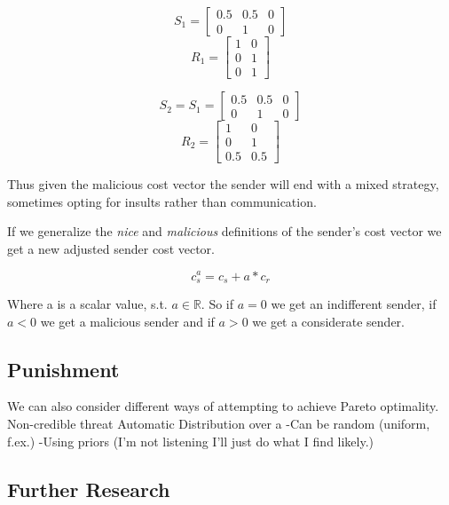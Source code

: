 \documentclass[10]{article}
\begin{document}
\begin{equation*}
S_1=
\begin{bmatrix}
0.5 & 0.5 & 0\\
0 & 1 & 0
\end{bmatrix}
\end{equation*}
\begin{equation*}
R_1=
\begin{bmatrix}
1 & 0\\
0 & 1\\
0 & 1
\end{bmatrix}
\end{equation*}

\begin{equation*}
S_2=S_1=
\begin{bmatrix}
0.5 & 0.5 & 0\\
0 & 1 & 0
\end{bmatrix}
\end{equation*}
\begin{equation*}
R_2=
\begin{bmatrix}
1 & 0\\
0 & 1\\
0.5 & 0.5
\end{bmatrix}
\end{equation*}

Thus given the malicious cost vector the sender will end with a mixed strategy, sometimes opting for insults rather than communication.

If we generalize the \textit{nice} and \textit{malicious} definitions of the sender's cost vector we get a new adjusted sender cost vector.

\begin{equation*}
c_s^a= c_s + a * c_r
\end{equation*}

Where a is a scalar value, s.t. $a \in \mathbb{R} $. So if $a=0$ we get an indifferent sender, if$a <0$ we get a malicious sender and if $a>0$ we get a considerate sender.

\subsection{Punishment}
We can also consider different ways of attempting to achieve Pareto optimality.
Non-credible threat
Automatic
Distribution over a
-Can be random (uniform, f.ex.)
-Using priors (I'm not listening I'll just do what I find likely.)

\subsection{Further Research}
\end{document}
